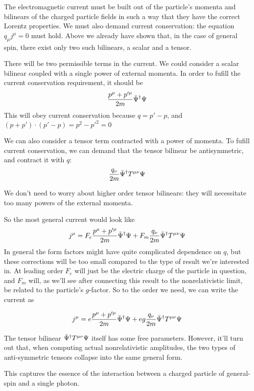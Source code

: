 The electromagnetic current must be built out of the particle's momenta and bilinears of the charged particle fields in such a way that they have the correct Lorentz properties.  We must also demand current conservation: the equation $q_\mu j^\mu = 0$ must hold.  Above we already have shown that, in the case of general spin, there exist only two such bilinears, a scalar and a tensor.

There will be two permissible terms in the current.  We could consider a scalar bilinear coupled with a single power of external momenta.  In order to fufill the current conservation requirement, it should be
\[
	\frac{p^\mu + p'^\mu}{2m} \bar{\Psi}^\dagger \Psi
\]
This will obey current conservation because $q = p' -p$, and $ (p+p')\cdot(p'-p) = p^2-p'^2=0$

We can also consider a tensor term contracted with a power of momenta.  To fufill current conservation, we can demand that the tensor bilinear be antisymmetric, and contract it with $q$:
\[
	\frac{q_\nu}{2m} \bar{\Psi}^\dagger T^{\mu\nu} \Psi
\]

We don't need to worry about higher order tensor bilinears: they will necessitate too many powers of the external momenta.

So the most general current would look like
\[
	j^\mu = F_e \frac{p^\mu + p'^\mu}{2m} \bar{\Psi}^\dagger \Psi + F_m 	\frac{q_\nu}{2m} \bar{\Psi}^\dagger T^{\mu\nu} \Psi	
\]
In general the form factors might have quite complicated dependence on $q$, but these corrections will be too small compared to the type of result we're interested in.  At leading order $F_e$ will just be the electric charge of the particle in question, and $F_m$ will, as we'll see after connecting this result to the nonrelativistic limit, be related to the particle's $g$-factor.  So to the order we need, we can write the current as

\[
	j^\mu =  e \frac{p^\mu + p'^\mu}{2m} \bar{\Psi}^\dagger \Psi +   e g \frac{q_\nu}{2m} \bar{\Psi}^\dagger T^{\mu\nu} \Psi
\]

The tensor bilinear $\bar{\Psi}^\dagger T^{\mu\nu} \Psi$ itself has some free parameters.  However, it'll turn out that, when computing actual nonrelativistic amplitudes, the two types of anti-symmetric tensors collapse into the same general form.

This captures the essence of the interaction between a charged particle of general-spin and a single photon.


